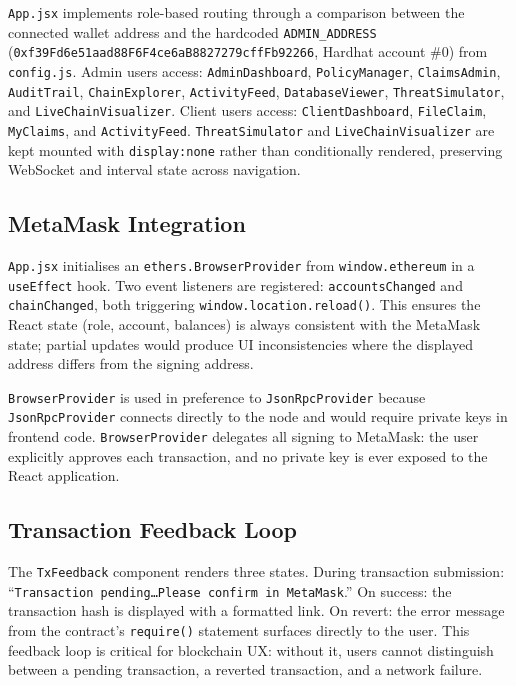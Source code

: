 \documentclass[12pt,a4paper]{article}
\begin{document}
\texttt{App.jsx} implements role-based routing through a comparison
between the connected wallet address and the hardcoded
\texttt{ADMIN\_ADDRESS} (\texttt{0xf39Fd6e51aad88F6F4ce6aB8827279cffFb92266},
Hardhat account \#0) from \texttt{config.js}. Admin users access:
\texttt{AdminDashboard}, \texttt{PolicyManager}, \texttt{ClaimsAdmin},
\texttt{AuditTrail}, \texttt{ChainExplorer}, \texttt{ActivityFeed},
\texttt{DatabaseViewer}, \texttt{ThreatSimulator}, and
\texttt{LiveChainVisualizer}. Client users access:
\texttt{ClientDashboard}, \texttt{FileClaim}, \texttt{MyClaims}, and
\texttt{ActivityFeed}. \texttt{ThreatSimulator} and
\texttt{LiveChainVisualizer} are kept mounted with \texttt{display:none}
rather than conditionally rendered, preserving WebSocket and interval
state across navigation.

\subsection{MetaMask Integration}
\label{sec:metamask}

\texttt{App.jsx} initialises an \texttt{ethers.BrowserProvider}
from \texttt{window.ethereum} in a \texttt{useEffect} hook.
Two event listeners are registered: \texttt{accountsChanged} and
\texttt{chainChanged}, both triggering \texttt{window.location.reload()}.
This ensures the React state (role, account, balances) is always
consistent with the MetaMask state; partial updates would produce UI
inconsistencies where the displayed address differs from the signing
address.

\texttt{BrowserProvider} is used in preference to
\texttt{JsonRpcProvider} because \texttt{JsonRpcProvider} connects
directly to the node and would require private keys in frontend code.
\texttt{BrowserProvider} delegates all signing to MetaMask: the user
explicitly approves each transaction, and no private key is ever exposed
to the React application.

\subsection{Transaction Feedback Loop}
\label{sec:tx-feedback}

The \texttt{TxFeedback} component renders three states. During
transaction submission: ``\texttt{Transaction pending\ldots Please
confirm in MetaMask}.'' On success: the transaction hash is displayed
with a formatted link. On revert: the error message from the contract's
\texttt{require()} statement surfaces directly to the user. This
feedback loop is critical for blockchain UX: without it, users cannot
distinguish between a pending transaction, a reverted transaction, and
a network failure.
\end{document}
